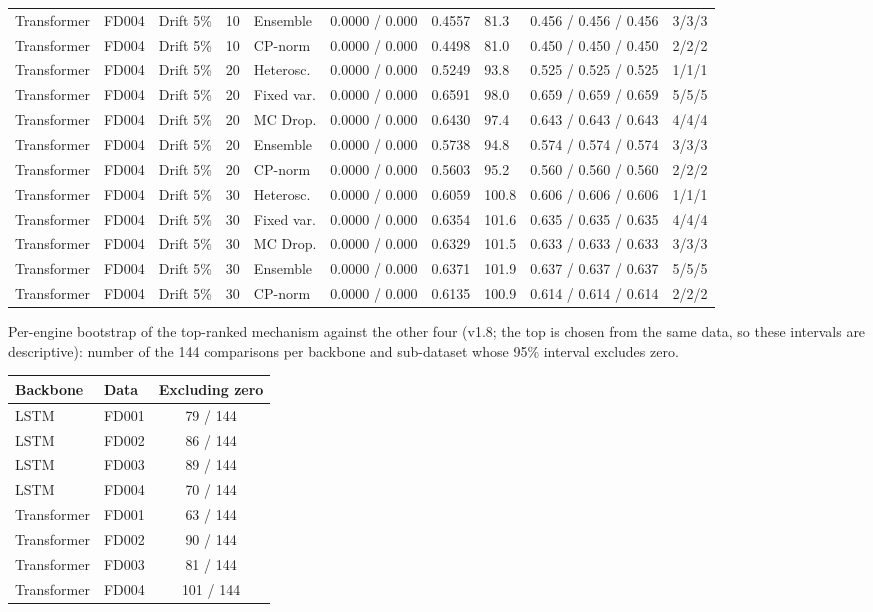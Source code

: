 \documentclass[10pt,a4paper]{article}
\begin{document}
\begin{landscape}
\begin{center}
\begin{longtable}{lllllcclll}
Transformer & FD004 & Drift 5\% & 10 & Ensemble & 0.0000 / 0.000 & 0.4557 & 81.3 & 0.456 / 0.456 / 0.456 & 3/3/3 \\
Transformer & FD004 & Drift 5\% & 10 & CP-norm & 0.0000 / 0.000 & 0.4498 & 81.0 & 0.450 / 0.450 / 0.450 & 2/2/2 \\
Transformer & FD004 & Drift 5\% & 20 & Heterosc. & 0.0000 / 0.000 & 0.5249 & 93.8 & 0.525 / 0.525 / 0.525 & 1/1/1 \\
Transformer & FD004 & Drift 5\% & 20 & Fixed var. & 0.0000 / 0.000 & 0.6591 & 98.0 & 0.659 / 0.659 / 0.659 & 5/5/5 \\
Transformer & FD004 & Drift 5\% & 20 & MC Drop. & 0.0000 / 0.000 & 0.6430 & 97.4 & 0.643 / 0.643 / 0.643 & 4/4/4 \\
Transformer & FD004 & Drift 5\% & 20 & Ensemble & 0.0000 / 0.000 & 0.5738 & 94.8 & 0.574 / 0.574 / 0.574 & 3/3/3 \\
Transformer & FD004 & Drift 5\% & 20 & CP-norm & 0.0000 / 0.000 & 0.5603 & 95.2 & 0.560 / 0.560 / 0.560 & 2/2/2 \\
Transformer & FD004 & Drift 5\% & 30 & Heterosc. & 0.0000 / 0.000 & 0.6059 & 100.8 & 0.606 / 0.606 / 0.606 & 1/1/1 \\
Transformer & FD004 & Drift 5\% & 30 & Fixed var. & 0.0000 / 0.000 & 0.6354 & 101.6 & 0.635 / 0.635 / 0.635 & 4/4/4 \\
Transformer & FD004 & Drift 5\% & 30 & MC Drop. & 0.0000 / 0.000 & 0.6329 & 101.5 & 0.633 / 0.633 / 0.633 & 3/3/3 \\
Transformer & FD004 & Drift 5\% & 30 & Ensemble & 0.0000 / 0.000 & 0.6371 & 101.9 & 0.637 / 0.637 / 0.637 & 5/5/5 \\
Transformer & FD004 & Drift 5\% & 30 & CP-norm & 0.0000 / 0.000 & 0.6135 & 100.9 & 0.614 / 0.614 / 0.614 & 2/2/2 \\
\bottomrule
\end{longtable}
\end{center}\end{landscape}
\noindent Per-engine bootstrap of the top-ranked mechanism against the other four (v1.8; the top is chosen from the same data, so these intervals are descriptive): number of the 144 comparisons per backbone and sub-dataset whose 95\% interval excludes zero.
\begin{center}\footnotesize\begin{tabular}{llc}\toprule Backbone & Data & Excluding zero \\ \midrule
LSTM & FD001 & 79 / 144 \\
LSTM & FD002 & 86 / 144 \\
LSTM & FD003 & 89 / 144 \\
LSTM & FD004 & 70 / 144 \\
Transformer & FD001 & 63 / 144 \\
Transformer & FD002 & 90 / 144 \\
Transformer & FD003 & 81 / 144 \\
Transformer & FD004 & 101 / 144 \\
\bottomrule\end{tabular}\end{center}
\end{document}
